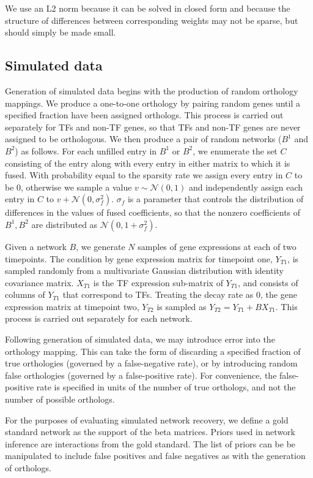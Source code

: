 \documentclass[11pt]{article}
\begin{document}
We use an L2 norm because it can be solved in closed form and because the structure of differences between corresponding weights may not be sparse, but should simply be made small.

\subsection{Simulated data}
Generation of simulated data begins with the production of random orthology mappings. We produce a one-to-one orthology by pairing random genes until a specified fraction have been assigned orthologs. This process is carried out separately for TFs and non-TF genes, so that TFs and non-TF genes are never assigned to be orthologous. We then produce a pair of random networks ($B^1$ and $B^2$) as follows. For each unfilled entry in $B^1$ or $B^2$, we enumerate the set $C$ consisting of the entry along with every entry in either matrix to which it is fused. With probability equal to the sparsity rate we assign every entry in $C$ to be 0, otherwise we sample a value $v \sim \mathcal{N}(0,1)$ and independently assign each entry in $C$ to $v + \mathcal{N}(0, \sigma_f^2)$. $\sigma_f$ is a parameter that controls the distribution of differences in the values of fused coefficients, so that the nonzero coefficients of $B^1, B^2$ are distributed as $\mathcal{N}(0, 1 + \sigma_f^2)$.

Given a network $B$, we generate $N$ samples of gene expressions at each of two timepoints. The condition by gene expression matrix for timepoint one, $Y_{T1}$, is sampled randomly from a multivariate Gaussian distribution with identity covariance matrix. $X_{T1}$ is the TF expression sub-matrix of $Y_{T1}$, and consists of columns of $Y_{T1}$ that correspond to TFs. Treating the decay rate as 0, the gene expression matrix at timepoint two, $Y_{T2}$ is sampled as $Y_{T2} = Y_{T1} + BX_{T1}$. This process is carried out separately for each network. 

Following generation of simulated data, we may introduce error into the orthology mapping. This can take the form of discarding a specified fraction of true orthologies (governed by a false-negative rate), or by introducing random false orthologies (governed by a false-positive rate). For convenience, the false-positive rate is specified in units of the number of true orthologs, and not the number of possible orthologs. 

For the purposes of evaluating simulated network recovery, we define a gold standard network as the support of the beta matrices. Priors used in network inference are interactions from the gold standard. The list of priors can be be manipulated to include false positives and false negatives as with the generation of orthologs. 
\end{document}
